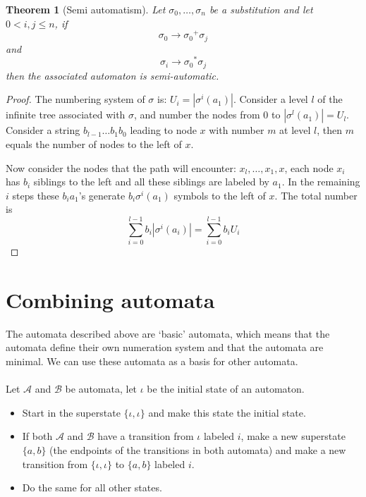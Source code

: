 \documentclass{article}
\newtheorem{theorem}{Theorem}[subsection]
\theoremstyle{definition}
\begin{document}
\begin{theorem}[Semi automatism] \label{thm:semiaut}
Let $\sigma_0, \ldots, \sigma_n$ be a substitution and let $0 < i, j \le n$, 
if
\begin{displaymath}
\sigma_0 \rightarrow {\sigma_0}^+ \sigma_j
\end{displaymath}
and
\begin{displaymath}
\sigma_i \rightarrow {\sigma_0}^* \sigma_j
\end{displaymath}
then the associated automaton is semi-automatic.
\end{theorem}
\begin{proof}
The numbering system of $\sigma$ is: $U_i = |\sigma^i(a_1)|$. 
Consider a level $l$ of the infinite tree associated with $\sigma$, and number 
the nodes from 0 to $|\sigma^l(a_1)| = U_l$.
Consider a string $b_{l - 1} \ldots b_1 b_0$ leading to node $x$ with number
$m$ at level $l$, then $m$ equals the number of nodes to the left of $x$.

Now consider the nodes that the path will encounter: $x_l, \ldots, x_1, x$, 
each node $x_i$ has $b_i$ siblings to the left and all these siblings are
labeled by $a_1$. In the remaining $i$ steps these $b_i a_1$'s generate
$b_i \sigma^i(a_1)$ symbols to the left of $x$. The total number is 
\begin{displaymath}
\sum_{i = 0}^{l - 1} b_i |\sigma^i(a_i)| = \sum_{i = 0}^{l - 1} b_i U_i
\end{displaymath}
\end{proof}

\section{Combining automata}
The automata described above are `basic' automata, which means that the 
automata define their own numeration system and that the automata are minimal.
We can use these automata as a basis for other automata.\\
\\
Let $\mathcal{A}$ and $\mathcal{B}$ be automata, let $\iota$ be the initial
state of an automaton.
\begin{itemize}
\item Start in the superstate $\{\iota, \iota\}$ and make this state the 
      initial state.
\item If both $\mathcal{A}$ and $\mathcal{B}$ have a transition from $\iota$ 
      labeled $i$, make a new superstate $\{a, b\}$ (the endpoints of the 
      transitions in both automata) and make a new transition from 
      $\{\iota, \iota\}$ to $\{a, b\}$ labeled $i$.
\item Do the same for all other states.
\end{itemize}
\end{document}
